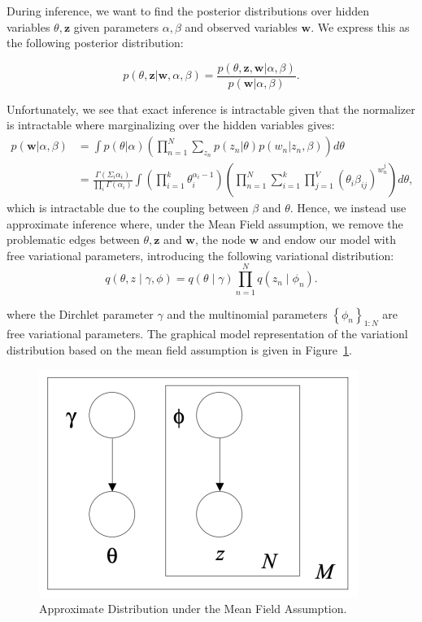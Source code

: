\documentclass[a4paper]{article}
\begin{document}
	During inference, we want to find the posterior distributions over hidden variables $\theta, \mathbf{z}$ given parameters $\alpha, \beta$ and observed variables $\mathbf{w}$. We express this as the following posterior distribution:
	
	\begin{equation}
		p(\theta, \mathbf{z} | \mathbf{w}, \alpha, \beta)=\frac{p(\theta, \mathbf{z}, \mathbf{w} | \alpha, \beta)}{p(\mathbf{w} | \alpha, \beta)}.
	\end{equation}
	
	\noindent Unfortunately, we see that exact inference is intractable given that the normalizer is intractable where marginalizing over the hidden variables gives:
	\begin{equation}
	\begin{aligned}
	p(\mathbf{w} | \alpha, \beta)&=\int p(\theta | \alpha)\left(\prod_{n=1}^{N} \sum_{z_{n}} p\left(z_{n} | \theta\right) p\left(w_{n} | z_{n}, \beta\right)\right) d \theta\\
	&=\frac{\Gamma\left(\Sigma_{i} \alpha_{i}\right)}{\prod_{i} \Gamma\left(\alpha_{i}\right)} \int\left(\prod_{i=1}^{k} \theta_{i}^{\alpha_{i}-1}\right)\left(\prod_{n=1}^{N} \sum_{i=1}^{k} \prod_{j=1}^{V}\left(\theta_{i} \beta_{i j}\right)^{w_{n}^{j}}\right) d \theta,
	\end{aligned}
	\end{equation}
	\noindent which is intractable due to the coupling between $\beta$ and $\theta$. Hence, we instead use approximate inference where, under the Mean Field assumption, we remove the problematic edges between $\theta, \mathbf{z}$ and $\mathbf{w}$, the node $\mathbf{w}$ and endow our model with free variational parameters, introducing the following variational distribution:
	\begin{equation}
		q(\theta,z \mid \gamma,\phi) = q(\theta\mid\gamma) \prod_{n=1}^{N} q(z_n\mid\phi_n).
	\end{equation}
	
	\noindent where the Dirchlet parameter $\gamma$ and the multinomial parameters $\left\{\phi_n\right\}_{1:N}$ are free variational parameters. The graphical model representation of the variationl distribution based on the mean field assumption is given in Figure~\ref{fig:approximategraphical}.
	
	\begin{figure}[ht]
		\centering
		\captionsetup{width=.8\linewidth}
		\includegraphics[width=0.5\linewidth]{images/approximate_graphical}
		\caption{Approximate Distribution under the Mean Field Assumption.}
		\label{fig:approximategraphical}
	\end{figure}
	
\end{document}
